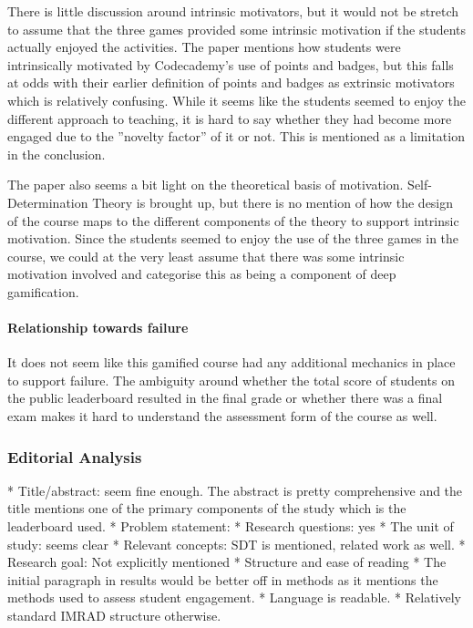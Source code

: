There is little discussion around intrinsic motivators, but it would not be stretch to assume that the three games provided some intrinsic motivation if the students actually enjoyed the activities. The paper mentions how students were intrinsically motivated by Codecademy's use of points and badges, but this falls at odds with their earlier definition of points and badges as extrinsic motivators which is relatively confusing. While it seems like the students seemed to enjoy the different approach to teaching, it is hard to say whether they had become more engaged due to the ''novelty factor'' of it or not. This is mentioned as a limitation in the conclusion. 

The paper also seems a bit light on the theoretical basis of motivation. Self-Determination Theory is brought up, but there is no mention of how the design of the course maps to the different components of the theory to support intrinsic motivation. Since the students seemed to enjoy the use of the three games in the course, we could at the very least assume that there was some intrinsic motivation involved and categorise this as being a component of deep gamification. 


\paragraph{Relationship towards failure}
It does not seem like this gamified course had any additional mechanics in place to support failure. The ambiguity around whether the total score of students on the public leaderboard resulted in the final grade or whether there was a final exam makes it hard to understand the assessment form of the course as well.  

\subsubsection{Editorial Analysis}
    * Title/abstract: seem fine enough. The abstract is pretty comprehensive and the title mentions one of the primary components of the study which is the leaderboard used. 
    * Problem statement:
        * Research questions: yes
        * The unit of study: seems clear
        * Relevant concepts: SDT is mentioned, related work as well. 
        * Research goal: Not explicitly mentioned
    * Structure and ease of reading
        * The initial paragraph in results would be better off in methods as it mentions the methods used to assess student engagement. 
        * Language is readable.
        * Relatively standard IMRAD structure otherwise. 
\fi

